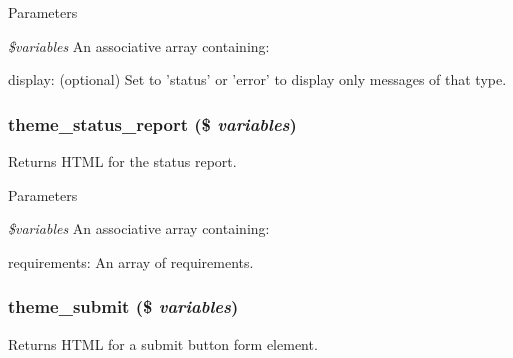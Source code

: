 \begin{DoxyParams}{Parameters}
\item[{\em \$variables}]An associative array containing:
\begin{DoxyItemize}
\item display: (optional) Set to 'status' or 'error' to display only messages of that type. 
\end{DoxyItemize}\end{DoxyParams}
\hypertarget{group__themeable_gad147c4639b7e85af6e3dcd3dc347366c}{
\subsubsection[{theme\_\-status\_\-report}]{\setlength{\rightskip}{0pt plus 5cm}theme\_\-status\_\-report (\$ {\em variables})}}
\label{group__themeable_gad147c4639b7e85af6e3dcd3dc347366c}
Returns HTML for the status report.


\begin{DoxyParams}{Parameters}
\item[{\em \$variables}]An associative array containing:
\begin{DoxyItemize}
\item requirements: An array of requirements. 
\end{DoxyItemize}\end{DoxyParams}
\hypertarget{group__themeable_ga6785cbeb4d96c1b2a1dd58f8648ed4cc}{
\subsubsection[{theme\_\-submit}]{\setlength{\rightskip}{0pt plus 5cm}theme\_\-submit (\$ {\em variables})}}
\label{group__themeable_ga6785cbeb4d96c1b2a1dd58f8648ed4cc}
Returns HTML for a submit button form element.


